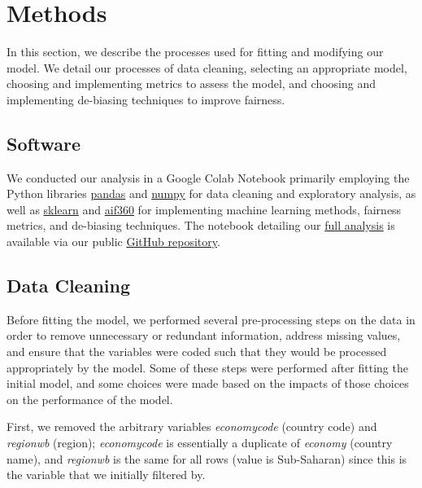 \documentclass[water,article,submit,moreauthors,pdftex]{mdpi}
\begin{document}
\hypertarget{methods}{%
\section{Methods}\label{methods}}

In this section, we describe the processes used for fitting and
modifying our model. We detail our processes of data cleaning, selecting
an appropriate model, choosing and implementing metrics to assess the
model, and choosing and implementing de-biasing techniques to improve
fairness.

\hypertarget{software}{%
\subsection{Software}\label{software}}

We conducted our analysis in a Google Colab Notebook primarily employing
the Python libraries \href{https://pandas.pydata.org/}{pandas} and
\href{https://numpy.org/}{numpy} for data cleaning and exploratory
analysis, as well as \href{https://scikit-learn.org/stable/}{sklearn}
and \href{https://aif360.readthedocs.io/en/latest/}{aif360} for
implementing machine learning methods, fairness metrics, and de-biasing
techniques. The notebook detailing our
\href{https://github.com/sds-capstone/2022-09-proj7-women-at-table/blob/main/final_project.ipynb}{full
analysis} is available via our public
\href{https://github.com/sds-capstone/2022-09-proj7-women-at-table}{GitHub
repository}.

\hypertarget{data-cleaning}{%
\subsection{Data Cleaning}\label{data-cleaning}}

Before fitting the model, we performed several pre-processing steps on
the data in order to remove unnecessary or redundant information,
address missing values, and ensure that the variables were coded such
that they would be processed appropriately by the model. Some of these
steps were performed after fitting the initial model, and some choices
were made based on the impacts of those choices on the performance of
the model.

First, we removed the arbitrary variables \emph{economycode} (country
code) and \emph{regionwb} (region); \emph{economycode} is essentially a
duplicate of \emph{economy} (country name), and \emph{regionwb} is the
same for all rows (value is Sub-Saharan) since this is the variable that
we initially filtered by.
\end{document}

